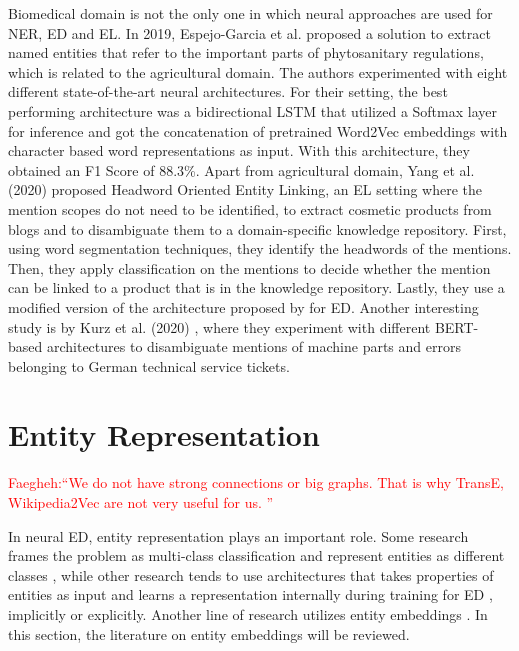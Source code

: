 \documentclass{report}
\theoremstyle{definition}
\theoremstyle{remark}
\begin{document}
Biomedical domain is not the only one in which neural approaches are used for NER, ED and EL. In 2019, Espejo-Garcia et al. \cite{agricultural} proposed a solution to extract named entities that refer to the important parts of phytosanitary regulations, which is related to the agricultural domain. The authors experimented with eight different state-of-the-art neural architectures. For their setting, the best performing architecture was a bidirectional LSTM \cite{bilstm} that utilized a Softmax layer for inference and got the concatenation of pretrained Word2Vec \cite{w2v} embeddings with character based word representations as input. With this architecture, they obtained an F1 Score of 88.3\%. Apart from agricultural domain, Yang et al. (2020) \cite{cosmetic} proposed Headword Oriented Entity Linking, an EL setting where the mention scopes do not need to be identified, to extract cosmetic products from blogs and to disambiguate them to a domain-specific knowledge repository. First, using word segmentation techniques, they identify the headwords of the mentions. Then, they apply classification on the mentions to decide whether the mention can be linked to a product that is in the knowledge repository. Lastly, they use a modified version of the architecture proposed by \cite{gupta} for ED.  Another interesting study is by Kurz et al. (2020) \cite{TechTickets}, where they experiment with different BERT-based \cite{BERT} architectures to disambiguate mentions of machine parts and errors belonging to German technical service tickets.

\section{Entity Representation}
\label{entityRep}

\textcolor{red}{Faegheh:``We do not have strong connections or big graphs. That is why TransE, Wikipedia2Vec are not very useful for us. ''}

In neural ED, entity representation plays an important role. Some research frames the problem as multi-class classification and represent entities as different classes \cite{bertEL,MedDiffArc,MedFeedback}, while other research tends to use architectures that takes properties of entities as input and learns a representation internally during training for ED \cite{scalablezeroshot}, implicitly or explicitly. Another line of research utilizes entity embeddings \cite{REL,kolitsas,dca,MedicalTriplet}. In this section, the literature on entity embeddings will be reviewed.
\end{document}
